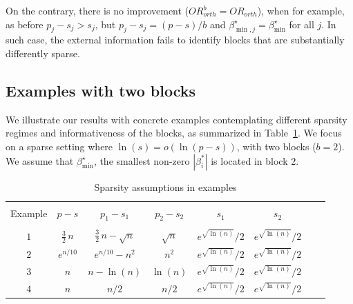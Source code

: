 \documentclass[aos]{imsart}
\theoremstyle{plain}
\begin{document}
On the contrary, there is no improvement 
(${OR}^b_{orth}={OR}_{orth}$), 
when for example, as before $p_j-s_j>s_j$, but $p_j-s_j=(p-s)/b$ 
 and $\beta^\star_{\min,j}=\beta_{\min}^\star$ for all $j$. In such case, the external information fails to identify blocks that are substantially differently sparse. 

\subsection{Examples with two blocks}\label{sec:examples}

We illustrate our results with concrete examples contemplating different sparsity regimes and informativeness of the blocks, as summarized in Table~\ref{tab:examples}. We focus on a sparse setting where $\ln(s)=o(\ln(p-s))$, with two blocks ($b=2$). We assume that $\beta_{\min}^{\star}$, the smallest non-zero $|\beta_i^*|$ is located in block $2$. 

\begin{table}[ht]
\caption{Sparsity assumptions in examples}
\label{tab:examples}
\begin{tabular}{@{}cccccccc@{}}
\hline \\[-1em]
Example & $p-s$ & $p_1-s_1$ & $p_2-s_2$ & $s_1$ 
& $s_2$\\[3pt]
\hline\\[-1em]
$1$    & $\frac{3}{2}\,n$ & $\frac{3}{2}\,n-\sqrt{n}$ & $\sqrt{n}$  & $e^{\sqrt{\ln(n)}}/2$  & $e^{\sqrt{\ln(n)}}/2$ \\[3pt]
$2$    & $e^{n/10}$ & $e^{n/10}-n^2$ & $n^2$  & $e^{\sqrt{\ln(n)}}/2$  & $e^{\sqrt{\ln(n)}}/2$   \\[3pt]
$3$    & $n$ & $n-\ln(n)$ & $\ln(n)$  & $e^{\sqrt{\ln(n)}}/2$  & $e^{\sqrt{\ln(n)}}/2$   \\[3pt]
$4$    & $n$ & $n/2$ & $n/2$  & $e^{\sqrt{\ln(n)}}/2$  & $e^{\sqrt{\ln(n)}}/2$ \\[3pt]
\hline
\end{tabular}
\end{table}
\end{document}
